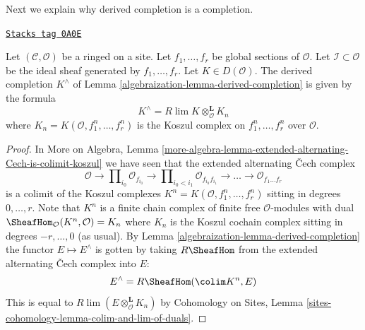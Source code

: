 Next we explain why derived completion is a completion.

\begin{lemma}
\label{algebraization-lemma-derived-completion-koszul}
\href{https://stacks.math.columbia.edu/tag/0A0E}{\texttt{Stacks tag 0A0E}}

Let $(\mathcal{C}, \mathcal{O})$ be a ringed on a site. Let $f_1, \ldots, f_r$
be global sections of $\mathcal{O}$. Let $\mathcal{I} \subset \mathcal{O}$ be
the ideal sheaf generated by $f_1, \ldots, f_r$. Let $K \in D(\mathcal{O})$.
The derived completion $K^\wedge$ of Lemma \ref{algebraization-lemma-derived-completion}
is given by the formula
$$
K^\wedge = R\lim K \otimes^\mathbf{L}_\mathcal{O} K_n
$$
where $K_n = K(\mathcal{O}, f_1^n, \ldots, f_r^n)$
is the Koszul complex on $f_1^n, \ldots, f_r^n$ over $\mathcal{O}$.
\end{lemma}

\begin{proof}

In More on Algebra, Lemma
\ref{more-algebra-lemma-extended-alternating-Cech-is-colimit-koszul}
we have seen that the extended alternating {\v C}ech complex
$$
\mathcal{O} \to \prod\nolimits_{i_0} \mathcal{O}_{f_{i_0}} \to
\prod\nolimits_{i_0 < i_1} \mathcal{O}_{f_{i_0}f_{i_1}} \to
\ldots \to \mathcal{O}_{f_1\ldots f_r}
$$
is a colimit of the Koszul complexes
$K^n = K(\mathcal{O}, f_1^n, \ldots, f_r^n)$ sitting in
degrees $0, \ldots, r$. Note that $K^n$ is a finite chain complex
of finite free $\mathcal{O}$-modules with dual
$\SheafHom_\mathcal{O}(K^n, \mathcal{O}) = K_n$ where $K_n$ is the Koszul
cochain complex sitting in degrees $-r, \ldots, 0$ (as usual). By
Lemma \ref{algebraization-lemma-derived-completion}
the functor $E \mapsto E^\wedge$ is gotten by taking
$R\SheafHom$ from the extended alternating {\v C}ech complex into $E$:
$$
E^\wedge = R\SheafHom(\colim K^n, E)
$$
This is equal to $R\lim (E \otimes_\mathcal{O}^\mathbf{L} K_n)$
by
Cohomology on Sites, Lemma \ref{sites-cohomology-lemma-colim-and-lim-of-duals}.
\end{proof}

